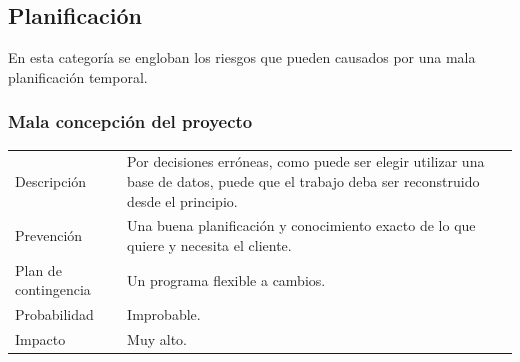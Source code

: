 \subsection{Planificaci\'{o}n}
En esta categor\'{i}a se engloban los riesgos que pueden causados por una mala planificaci\'{o}n 
temporal.
\subsubsection{Mala concepci\'{o}n del proyecto}
\begin{table}[H]
    \begin{center}
       \begin{tabular}{l p{8cm}}
           Descripci\'{o}n                 & Por decisiones erróneas, como puede ser elegir 
           utilizar una
           base de datos, puede que el trabajo deba ser reconstruido desde el principio. \\
           Prevenci\'{o}n                  & Una buena planificación y conocimiento exacto de lo 
           que quiere y necesita el cliente. 
           									  \\ 
           Plan de contingencia            & Un programa flexible a cambios. \\
           Probabilidad                    & Improbable. \\
           Impacto                         & Muy alto. \\
        \end{tabular}
    \end{center}
    
\end{table}

\clearpage

